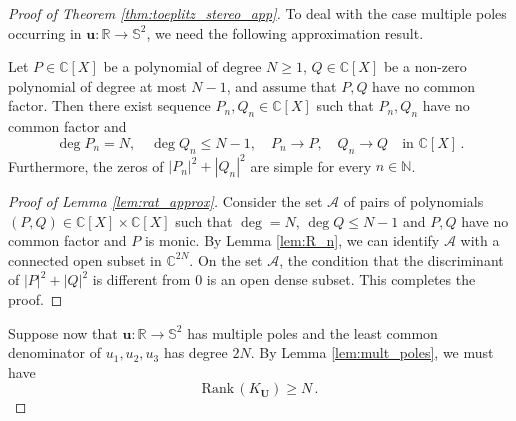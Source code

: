 \documentclass[10pt,a4paper]{amsart}
\newcommand{\C}{\mathbb{C}}
\newcommand{\N}{\mathbb{N}}
\newcommand{\R}{\mathbb{R}}
\newcommand{\Ss}{\mathbb{S}}
\newcommand{\Ub}{\mathbf{U}}
\newcommand{\uu}{\mathbf{u}}
\renewcommand{\geq}{\geqslant}
\renewcommand{\leq}{\leqslant}
\begin{document}
\begin{proof}[Proof of Theorem \ref{thm:toeplitz_stereo_app}]
To deal with the case multiple poles occurring in $\uu : \R \to \Ss^2$, we need the following approximation result.

\begin{lem} \label{lem:rat_approx}
Let $P \in \C[X]$ be a polynomial of degree $N \geq 1$, $Q \in  \C[X]$ be a non-zero polynomial of degree at most $N-1$, and assume that $P,Q$ have no common factor. Then there exist sequence $P_n, Q_n \in \C[X]$ such that $P_n, Q_n$ have no common factor and
$$
\deg P_n = N, \quad \deg Q_n \leq N-1, \quad P_n \to P, \quad Q_n \to Q \quad \mbox{in $\C[X]$} \, .
$$
Furthermore, the zeros of $|P_n|^2 + |Q_n|^2$ are simple for every $n \in \N$.
\end{lem}

\begin{proof}[Proof of Lemma \ref{lem:rat_approx}]
Consider the set $\mathcal{A}$ of pairs of polynomials $(P,Q) \in \C[X] \times \C[X]$ such that $\deg = N$, $\deg Q \leq N-1$ and $P,Q$ have no common factor and $P$ is monic. By Lemma \ref{lem:R_n}, we can identify $\mathcal{A}$ with a connected open subset in $\C^{2N}$. On the set $\mathcal{A}$, the condition that the discriminant of $|P|^2 + |Q|^2$ is different from 0 is an open dense subset. This completes the proof. 
\end{proof}

Suppose now that $\uu : \R \to \Ss^2$ has multiple poles and the least common denominator of $u_1, u_2, u_3$ has degree $2N$. By Lemma \ref{lem:mult_poles}, we must have
$$
\mathrm{Rank} \, (K_{\Ub}) \geq N \, .
$$


\end{proof}
\end{document}
